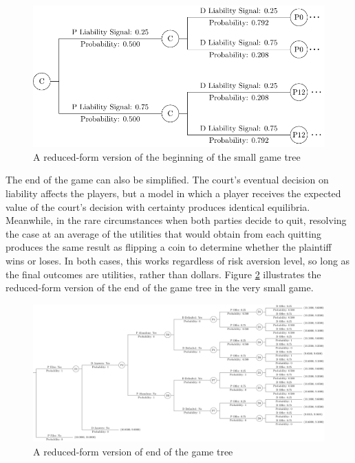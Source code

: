 \documentclass{article}
\begin{document}
\begin{figure}[h!]
\centering
\includegraphics[scale=0.25, trim={0in 0in 0in 0in}, clip]{../Figures/game tree 2x2x2 beginning simplified.pdf}
\caption{A reduced-form version of the beginning of the small game tree}
\label{fig:gametree2x2x2beginning_reduced}
\end{figure}

The end of the game can also be simplified. The court's eventual decision on liability affects the players, but a model in which a player receives the expected value of the court's decision with certainty produces identical equilibria. Meanwhile, in the rare circumstances when both parties decide to quit, resolving the case at an average of the utilities that would obtain from each quitting produces the same result as flipping a coin to determine whether the plaintiff wins or loses. In both cases, this works regardless of risk aversion level, so long as the final outcomes are utilities, rather than dollars. Figure \ref{fig:gametree2x2x2end_reduced} illustrates the reduced-form version of the end of the game tree in the very small game.

\begin{figure}[h!]
\centering
\includegraphics[scale=0.25, trim={0in 0in 0in 0in}, clip]{../Figures/game tree 2x2x2 end simplified.pdf}
\caption{A reduced-form version of end of the game tree}
\label{fig:gametree2x2x2end_reduced}
\end{figure}
\end{document}
